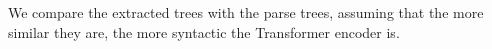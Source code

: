 \documentclass[11pt,a4paper]{article}
\newcommand\ie{i.e.\ }
\def\RR#1{{\color{blue}RR: \it #1}}
\def\DM#1{{\color{red}DM: \it #1}}
\def\JLrepl#1#2{{\color{magenta}JL: \sout{#1} \it #2}}
\def\JLrepl#1#2{}
\def\RR#1{}
\def\DM#1{}
\begin{document}

We compare the extracted trees with the parse trees, assuming that the more similar they are, the more syntactic the Transformer encoder is.


\end{document}
